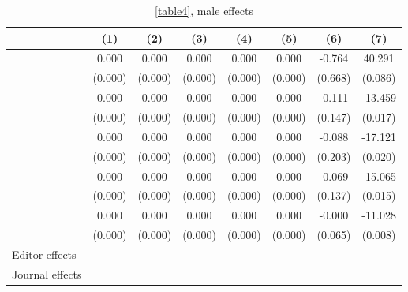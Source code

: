 \begin{table}[H]
    \footnotesize
    \centering
    \begin{threeparttable}
        \caption{\autoref{table4}, male effects}
        \label{tableC2}
        \begin{tabular}{p{2.64cm}S@{}S@{}S@{}S@{}S@{}S@{}S@{}}
            \toprule
            &{(1)}&{(2)}&{(3)}&{(4)}&{(5)}&{(6)}&{(7)}\\
            \midrule
            &       0.000&       0.000&       0.000&       0.000&       0.000&      -0.764&      40.291\\
                                          &     (0.000)&     (0.000)&     (0.000)&     (0.000)&     (0.000)&     (0.668)&     (0.086)\\
                &       0.000&       0.000&       0.000&       0.000&       0.000&      -0.111&     -13.459\\
                                          &     (0.000)&     (0.000)&     (0.000)&     (0.000)&     (0.000)&     (0.147)&     (0.017)\\
                   &       0.000&       0.000&       0.000&       0.000&       0.000&      -0.088&     -17.121\\
                                          &     (0.000)&     (0.000)&     (0.000)&     (0.000)&     (0.000)&     (0.203)&     (0.020)\\
                          &       0.000&       0.000&       0.000&       0.000&       0.000&      -0.069&     -15.065\\
                                          &     (0.000)&     (0.000)&     (0.000)&     (0.000)&     (0.000)&     (0.137)&     (0.015)\\
                    &       0.000&       0.000&       0.000&       0.000&       0.000&      -0.000&     -11.028\\
                                          &     (0.000)&     (0.000)&     (0.000)&     (0.000)&     (0.000)&     (0.065)&     (0.008)\\
            \midrule
            Editor effects                &           {}&           {}&           {}&           {}&           {}&           {}&           {}\\
            Journal effects               &           {}&           {}&           {}&           {}&           {}&           {}&           {}\\

\end{tabular}
\end{threeparttable}
\end{table}
